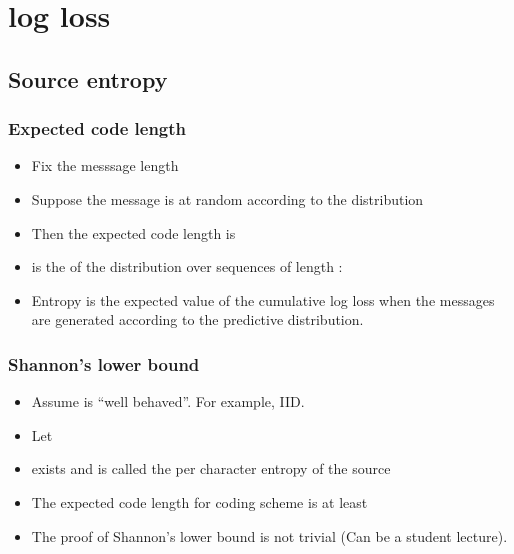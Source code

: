 \documentclass{beamer}
\begin{document}
\section{log loss}
\subsection{Source entropy}

\begin{frame}
\frametitle{Expected code length}
\begin{itemize}
\item Fix the messsage length 
\item Suppose the message is  at random according to the distribution 
\item Then the expected code length is 
\item {} is the  of the distribution over
  sequences of length :
\item Entropy is the expected value of the cumulative log loss when the messages are generated according to the predictive distribution.
\end{itemize}
\end{frame}

\begin{frame}
\frametitle{Shannon's lower bound}
\begin{itemize}
\item Assume  is ``well behaved''. For example, IID.
\item Let 
\item {} exists and is called the per character entropy of the source 
\item The expected code length for  coding scheme is at least 
\R{\[
\paren{1-o(1)} H(p_T) = \paren{1-o(1)}\; T\; H(p)
\]}
\item The proof of Shannon's lower bound is not trivial (Can be a
  student lecture).
\end{itemize}
\end{frame}
\end{document}
